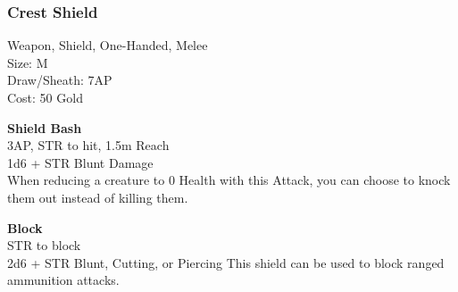 \subsubsection{Crest Shield}\label{weapon:crestShield}
Weapon, Shield, One-Handed, Melee\\
Size: M\\
Draw/Sheath: 7AP\\
Cost: 50 Gold

\textbf{Shield Bash}\\
3AP, STR to hit, 1.5m Reach\\
1d6 + \texttimes STR Blunt Damage\\
When reducing a creature to 0 Health with this Attack, you can choose to knock them out instead of killing them.

\textbf{Block}\\
STR to block\\
2d6 + \texttimes STR Blunt, Cutting, or Piercing
This shield can be used to block ranged ammunition attacks.\\

